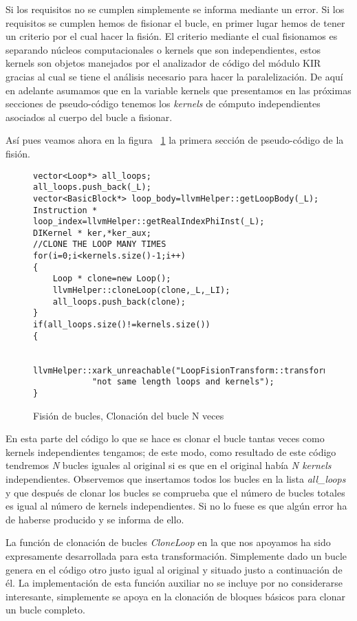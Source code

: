 Si los requisitos no se cumplen simplemente se informa mediante un error.
Si los requisitos se cumplen hemos de fisionar el bucle, en primer lugar hemos de tener un criterio por el cual hacer la fisión. El criterio mediante el cual fisionamos es separando núcleos computacionales o kernels que son independientes, estos kernels son objetos manejados por el analizador de código del módulo KIR gracias al cual se tiene el análisis necesario para hacer la paralelización. De aquí en adelante asumamos que en la variable kernels que presentamos en las próximas secciones de pseudo-código tenemos los \textit{kernels} de cómputo independientes asociados al cuerpo del bucle a fisionar.

Así pues veamos ahora en la figura ~\ref{FIG:LoopFisionClones} la primera sección de pseudo-código de la fisión.


\begin{figure}[t]
\begin{lstlisting}
vector<Loop*> all_loops;
all_loops.push_back(_L);
vector<BasicBlock*> loop_body=llvmHelper::getLoopBody(_L);
Instruction * loop_index=llvmHelper::getRealIndexPhiInst(_L);
DIKernel * ker,*ker_aux;	
//CLONE THE LOOP MANY TIMES
for(i=0;i<kernels.size()-1;i++)
{
	Loop * clone=new Loop();
	llvmHelper::cloneLoop(clone,_L,_LI);
	all_loops.push_back(clone);
}
if(all_loops.size()!=kernels.size())
{

	llvmHelper::xark_unreachable("LoopFisionTransform::transform()"
			"not same length loops and kernels");
}
\end{lstlisting}
\caption{Fisión de bucles, Clonación del bucle N veces}
\label{FIG:LoopFisionClones}
\end{figure}

En esta parte del código lo que se hace es clonar el bucle tantas veces como kernels independientes tengamos; de este modo, como resultado de este código tendremos \textit{N} bucles iguales al original si es que en el original había \textit{N kernels} independientes.
Observemos que insertamos todos los bucles en la lista \textit{all\_loops} y que después de clonar los bucles se comprueba que el número de bucles totales es igual al número de kernels independientes. Si no lo fuese es que algún error ha de haberse producido y se informa de ello.

La función de clonación de bucles \textit{CloneLoop} en la que nos apoyamos ha sido expresamente desarrollada para esta transformación. Simplemente dado un bucle genera en el código otro justo igual al original y situado justo a continuación de él. La implementación de esta función auxiliar no se incluye por no considerarse interesante, simplemente se apoya en la clonación de bloques básicos para clonar un bucle completo.

